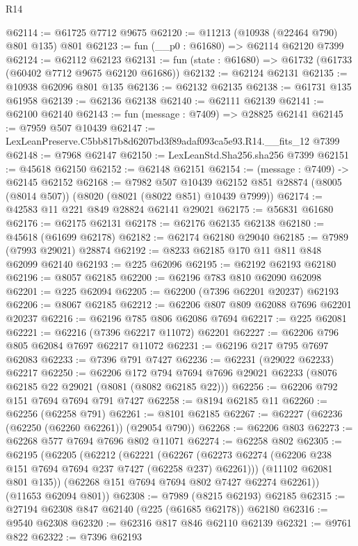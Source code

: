 \begin{lexlean}{R14}
\begin{coremodule}
@62114 := @61725 @7712 @9675
@62120 := @11213 (@10938 (@22464 @790) @801 @135) @801
@62123 := fun (__p0 : @61680) => @62114 @62120 @7399
@62124 := @62112 @62123
@62131 := fun (state : @61680) => @61732 (@61733 (@60402 @7712 @9675 @62120 @61686))
@62132 := @62124 @62131
@62135 := @10938 @62096 @801 @135
@62136 := @62132 @62135
@62138 := @61731 @135 @61958
@62139 := @62136 @62138
@62140 := @62111 @62139
@62141 := @62100 @62140
@62143 := fun (message : @7409) => @28825 @62141
@62145 := @7959 @507 @10439
@62147 := LexLeanPreserve.C5bb817b8d6207bd3f89adaf093ca5e93.R14.__fits_12 @7399
@62148 := @7968 @62147
@62150 := LexLeanStd.Sha256.sha256 @7399
@62151 := @45618 @62150
@62152 := @62148 @62151
@62154 := (message : @7409) -> @62145 @62152
@62168 := @7982
    @507
    @10439
    @62152
    @851
    @28874
    (@8005 (@8014 @507))
    (@8020 (@8021 (@8022 @851) @10439 @7999))
@62174 := @42583 @11 @221 @849 @28824 @62141 @29021
@62175 := @56831 @61680
@62176 := @62175 @62131
@62178 := @62176 @62135 @62138
@62180 := @45618 (@61699 @62178)
@62182 := @62174 @62180 @29040
@62185 := @7989 (@7993 @29021) @28874
@62192 := @8233 @62185 @170 @11 @811 @848 @62099 @62140
@62193 := @225 @62096
@62195 := @62192 @62193 @62180
@62196 := @8057 @62185
@62200 := @62196 @783 @810 @62090 @62098
@62201 := @225 @62094
@62205 := @62200 (@7396 @62201 @20237) @62193
@62206 := @8067 @62185
@62212 := @62206 @807 @809 @62088 @7696 @62201 @20237
@62216 := @62196 @785 @806 @62086 @7694
@62217 := @225 @62081
@62221 := @62216 (@7396 @62217 @11072) @62201
@62227 := @62206 @796 @805 @62084 @7697 @62217 @11072
@62231 := @62196 @217 @795 @7697 @62083
@62233 := @7396 @791 @7427
@62236 := @62231 (@29022 @62233) @62217
@62250 := @62206
    @172
    @794
    @7694
    @7696
    @29021
    @62233
    (@8076 @62185 @22 @29021 (@8081 (@8082 @62185 @22)))
@62256 := @62206 @792 @151 @7694 @7694 @791 @7427
@62258 := @8194 @62185 @11
@62260 := @62256 (@62258 @791)
@62261 := @8101 @62185
@62267 := @62227 (@62236 (@62250 (@62260 @62261)) (@29054 @790))
@62268 := @62206 @803
@62273 := @62268 @577 @7694 @7696 @802 @11071
@62274 := @62258 @802
@62305 := @62195
    (@62205
      (@62212
        (@62221
          (@62267 (@62273 @62274 (@62206 @238 @151 @7694 @7694 @237 @7427 (@62258 @237) @62261)))
          (@11102 @62081 @801 @135))
        (@62268 @151 @7694 @7694 @802 @7427 @62274 @62261))
      (@11653 @62094 @801))
@62308 := @7989 (@8215 @62193) @62185
@62315 := @27194 @62308 @847 @62140 (@225 (@61685 @62178)) @62180
@62316 := @9540 @62308
@62320 := @62316 @817 @846 @62110 @62139
@62321 := @9761 @822
@62322 := @7396 @62193

\end{coremodule}
\end{lexlean}
